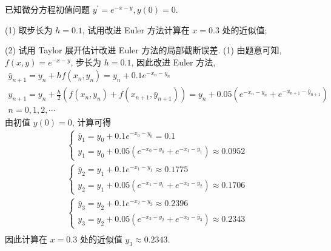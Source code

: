     \begin{tcolorbox}[enhanced,colback=8,colframe=7,breakable,coltitle=green!25!black,title=2024]
 已知微分方程初值问题 $ y^{\prime}=e^{-x-y}, y(0)=0 $.

(1) 取步长为 $ h=0.1 $, 试用改进 Euler 方法计算在 $ x=0.3 $ 处的近似值;

(2) 试用 Taylor 展开估计改进 Euler 方法的局部截断误差.
 \tcblower
 (1) 由题意可知, $ f(x, y)=e^{-x-y} $, 步长为 $ h=0.1 $, 因此改进 Euler 方法,
$$
\begin{array}{c}
\bar{y}_{n+1}=y_{n}+h f\left(x_{n}, y_{n}\right)=y_{n}+0.1 e^{-x_{n}-y_{n}} \\
y_{n+1}=y_{n}+\frac{h}{2}\left(f\left(x_{n}, y_{n}\right)+f\left(x_{n+1}, \bar{y}_{n+1}\right)\right)=y_{n}+0.05\left(e^{-x_{n}-y_{n}}+e^{-x_{n+1}-\bar{y}_{n+1}}\right) \\
n=0,1,2, \cdots
\end{array}
$$
由初值 $ y(0)=0 $, 计算可得
$$
\begin{array}{l}
\left\{\begin{array}{l}
\bar{y}_{1}=y_{0}+0.1 e^{-x_{0}-y_{0}}=0.1 \\
y_{1}=y_{0}+0.05\left(e^{-x_{0}-y_{0}}+e^{-x_{1}-\bar{y}_{1}}\right) \approx 0.0952
\end{array}\right. \\
\left\{\begin{array}{l}
\bar{y}_{2}=y_{1}+0.1 e^{-x_{1}-y_{1}} \approx 0.1775 \\
y_{2}=y_{1}+0.05\left(e^{-x_{1}-y_{1}}+e^{-x_{2}-\bar{y}_{2}}\right) \approx 0.1706
\end{array}\right. \\
\left\{\begin{array}{l}
\bar{y}_{3}=y_{2}+0.1 e^{-x_{2}-y_{2}} \approx 0.2396 \\
y_{3}=y_{2}+0.05\left(e^{-x_{2}-y_{2}}+e^{-x_{3}-\bar{y}_{3}}\right) \approx 0.2343
\end{array}\right. \\
\end{array}
$$
因此计算在 $ x=0.3 $ 处的近似值 $ y_{3} \approx 0.2343 $.


\end{tcolorbox}

